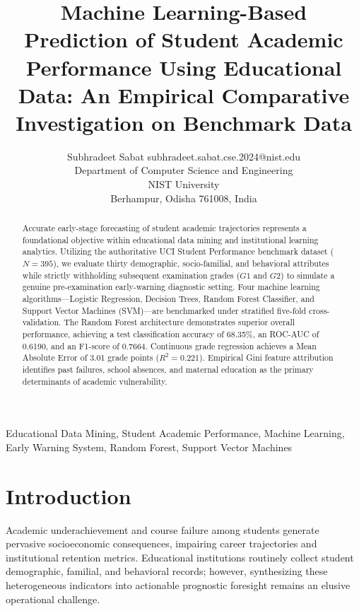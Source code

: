 \documentclass[twoside,11pt]{article}
\begin{document}
\title{Machine Learning-Based Prediction of Student Academic Performance Using Educational Data: An Empirical Comparative Investigation on Benchmark Data}

\author{\name Subhradeet Sabat \email subhradeet.sabat.cse.2024@nist.edu \\
       \addr Department of Computer Science and Engineering\\
       NIST University\\
       Berhampur, Odisha 761008, India}


\maketitle

\begin{abstract}
Accurate early-stage forecasting of student academic trajectories represents a foundational objective within educational data mining and institutional learning analytics. Utilizing the authoritative UCI Student Performance benchmark dataset ($N = 395$), we evaluate thirty demographic, socio-familial, and behavioral attributes while strictly withholding subsequent examination grades ($G1$ and $G2$) to simulate a genuine pre-examination early-warning diagnostic setting. Four machine learning algorithms---Logistic Regression, Decision Trees, Random Forest Classifier, and Support Vector Machines (SVM)---are benchmarked under stratified five-fold cross-validation. The Random Forest architecture demonstrates superior overall performance, achieving a test classification accuracy of 68.35\%, an ROC-AUC of 0.6190, and an F1-score of 0.7664. Continuous grade regression achieves a Mean Absolute Error of 3.01 grade points ($R^2 = 0.221$). Empirical Gini feature attribution identifies past failures, school absences, and maternal education as the primary determinants of academic vulnerability.
\end{abstract}

\begin{keywords}
Educational Data Mining, Student Academic Performance, Machine Learning, Early Warning System, Random Forest, Support Vector Machines
\end{keywords}

\section{Introduction}
Academic underachievement and course failure among students generate pervasive socioeconomic consequences, impairing career trajectories and institutional retention metrics. Educational institutions routinely collect student demographic, familial, and behavioral records; however, synthesizing these heterogeneous indicators into actionable prognostic foresight remains an elusive operational challenge.
\end{document}
